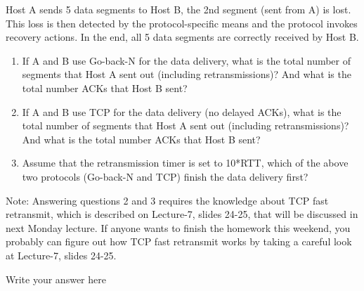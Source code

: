 \documentclass{report}
\begin{document}
\mktitle

\begin{problem}

Host A sends 5 data segments to Host B, the 2nd segment (sent from A) is lost. This loss is then detected by the protocol-specific means and the protocol invokes recovery actions. In the end, all 5 data segments are correctly received by Host B.

\begin{enumerate}
\item If A and B use Go-back-N for the data delivery, what is the total number of segments that Host A sent out (including retransmissions)? And what is the total number ACKs that Host B sent?

\item If A and B use TCP for the data delivery (no delayed ACKs), what is the total number of segments that Host A sent out (including retransmissions)? And what is the total number ACKs that Host B sent?

\item Assume that the retransmission timer is set to 10*RTT, which of the above two protocols (Go-back-N and TCP) finish the data delivery first?
\end{enumerate}
Note: Answering questions 2 and 3 requires the knowledge about TCP fast retransmit, which is described on Lecture-7, slides 24-25, that will be discussed in next Monday lecture. If anyone wants to finish the homework this weekend, you probably can figure out how TCP fast retransmit works by taking a careful look at Lecture-7, slides 24-25.

\begin{answer}{40em}
    Write your answer here
\end{answer}

\end{problem}



\newpage
\end{document}
